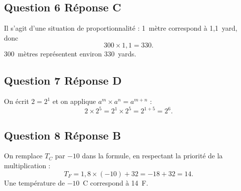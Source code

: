\subsection*{Question 6 \quad Réponse C}

Il s'agit d'une situation de proportionnalité : 1~mètre correspond à 1,1~yard, donc
\[300 \times 1,1 = 330.\]
300~mètres représentent environ 330~yards.

\subsection*{Question 7 \quad Réponse D}

On écrit $2 = 2^1$ et on applique $a^m \times a^n = a^{m+n}$ :
\[2 \times 2^5 = 2^1 \times 2^5 = 2^{1+5} = 2^6.\]

\subsection*{Question 8 \quad Réponse B}

On remplace $T_C$ par $-10$ dans la formule, en respectant la priorité de la
multiplication :
\[T_F = 1,8 \times (-10) + 32 = -18 + 32 = 14.\]
Une température de $-10$~\textdegree C correspond à 14~\textdegree F.
